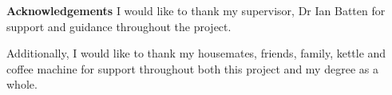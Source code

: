 {\huge\textbf{Acknowledgements}}
\vspace{0.7cm}
\newline
I would like to thank my supervisor, Dr Ian Batten for support and guidance throughout the project.
\par
Additionally, I would like to thank my housemates, friends, family, kettle and coffee machine for support throughout both this project and my degree as a whole.
